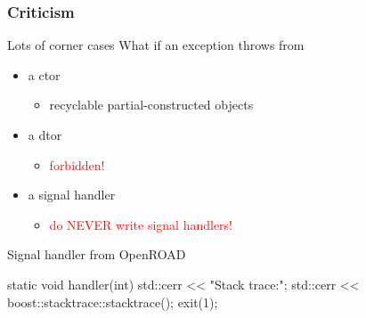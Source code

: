 \documentclass[UTF8,lualatex]{ctexbeamer}
\begin{document}

\begin{frame}[fragile]
    \frametitle{Criticism}
    \begin{block}{Lots of corner cases}
        What if an exception throws from
        \begin{itemize}
            \item a ctor
                \begin{itemize}
                    \item recyclable partial-constructed objects
                \end{itemize}
            \item a dtor
                \begin{itemize}
                    \item \textcolor{red}{forbidden!}
                \end{itemize}
            \item a signal handler
                \begin{itemize}
                    \item \textcolor{red}{do NEVER write signal handlers!}
                \end{itemize}
        \end{itemize}
    \end{block}
    \begin{exampleblock}{Signal handler from OpenROAD}
        \footnotesize
        \begin{cppcode}
            static void handler(int) {
                std::cerr << "Stack trace:\n";
                std::cerr << boost::stacktrace::stacktrace();
                exit(1);
            }
        \end{cppcode}
    \end{exampleblock}
\end{frame}
\end{document}
